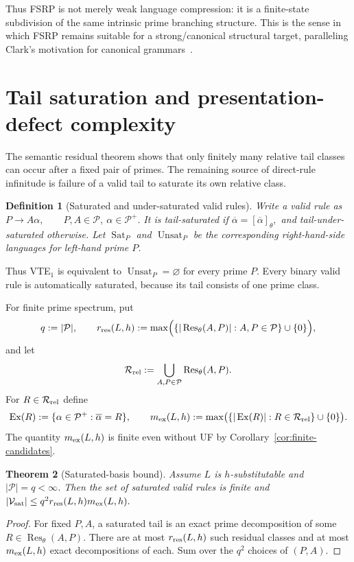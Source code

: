 \documentclass[11pt,a4paper]{article}
\newtheorem{theorem}{Theorem}[section]
\newtheorem{definition}[theorem]{Definition}
\newcommand{\Pcal}{\mathcal P}
\newcommand{\Vcal}{\mathcal V}
\newcommand{\Sat}{\operatorname{Sat}}
\newcommand{\Unsat}{\operatorname{Unsat}}
\newcommand{\Ex}{\operatorname{Ex}}
\begin{document}
Thus FSRP is not merely weak language compression: it is a finite-state subdivision of the same intrinsic prime branching structure.  This is the sense in which FSRP remains suitable for a strong/canonical structural target, paralleling Clark's motivation for canonical grammars~\cite{Clark2013Trees}.

\section{Tail saturation and presentation-defect complexity}
\label{sec:saturation}

The semantic residual theorem shows that only finitely many relative tail classes can occur after a fixed pair of primes.  The remaining source of direct-rule infinitude is failure of a valid tail to saturate its own relative class.

\begin{definition}[Saturated and under-saturated valid rules]
Write a valid rule as
\(P\to A\alpha, \qquad P,A\in\Pcal,\ \alpha\in\Pcal^+.\)
It is \emph{tail-saturated} if
\(\overline\alpha=[\overline\alpha]_\theta,\)
and \emph{tail-under-saturated} otherwise.  Let $\Sat_P$ and $\Unsat_P$ be the corresponding right-hand-side languages for left-hand prime $P$.
\end{definition}

Thus VTE$_1$ is equivalent to $\Unsat_P=\varnothing$ for every prime $P$.  Every binary valid rule is automatically saturated, because its tail consists of one prime class.

For finite prime spectrum, put
\[
  q:=|\Pcal|,
  \qquad
  r_{\rm res}(L,h):=\max\Bigl(\{|\operatorname{Res}_\theta(A,P)|:A,P\in\Pcal\}\cup\{0\}\Bigr),
\]
and let
\[
  \mathcal R_{\rm rel}:=\bigcup_{A,P\in\Pcal}\operatorname{Res}_\theta(A,P).
\]
For $R\in\mathcal R_{\rm rel}$ define
\[
  \Ex(R):=\{\alpha\in\Pcal^+:\overline\alpha=R\},
  \qquad
  m_{\rm ex}(L,h):=\max\bigl(\{|\Ex(R)|:R\in\mathcal R_{\rm rel}\}\cup\{0\}\bigr).
\]
The quantity $m_{\rm ex}(L,h)$ is finite even without UF by Corollary~\ref{cor:finite-candidates}.

\begin{theorem}[Saturated-basis bound]
\label{thm:saturated-basis-bound}
Assume $L$ is $h$-substitutable and $|\Pcal|=q<\infty$.  Then the set of saturated valid rules is finite and
\(|\Vcal_{\mathrm{sat}}| \le q^2 r_{\rm res}(L,h)m_{\rm ex}(L,h).\)
\end{theorem}

\begin{proof}
For fixed $P,A$, a saturated tail is an exact prime decomposition of some $R\in\operatorname{Res}_\theta(A,P)$.  There are at most $r_{\rm res}(L,h)$ such residual classes and at most $m_{\rm ex}(L,h)$ exact decompositions of each.  Sum over the $q^2$ choices of $(P,A)$.
\end{proof}
\end{document}
